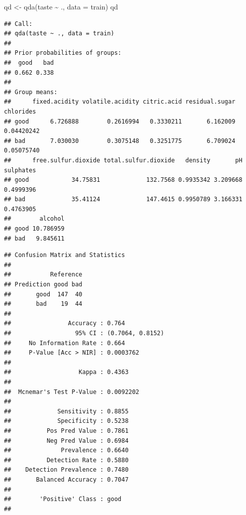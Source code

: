 \documentclass[
  spanish,
]{book}
\newenvironment{Shaded}{\begin{snugshade}}{\end{snugshade}}
\newcommand{\AttributeTok}[1]{\textcolor[rgb]{0.77,0.63,0.00}{#1}}
\newcommand{\FunctionTok}[1]{\textcolor[rgb]{0.00,0.00,0.00}{#1}}
\newcommand{\NormalTok}[1]{#1}
\newcommand{\OtherTok}[1]{\textcolor[rgb]{0.56,0.35,0.01}{#1}}
\newcommand{\SpecialCharTok}[1]{\textcolor[rgb]{0.00,0.00,0.00}{#1}}
\theoremstyle{break}
\theoremstyle{definition}
\theoremstyle{definition}
\theoremstyle{definition}
\theoremstyle{definition}
\theoremstyle{remark}
\begin{document}
\begin{Shaded}
\begin{Highlighting}[]
\NormalTok{qd }\OtherTok{\textless{}{-}} \FunctionTok{qda}\NormalTok{(taste }\SpecialCharTok{\textasciitilde{}}\NormalTok{ ., }\AttributeTok{data =}\NormalTok{ train)}
\NormalTok{qd}
\end{Highlighting}
\end{Shaded}

\begin{verbatim}
## Call:
## qda(taste ~ ., data = train)
## 
## Prior probabilities of groups:
##  good   bad 
## 0.662 0.338 
## 
## Group means:
##      fixed.acidity volatile.acidity citric.acid residual.sugar  chlorides
## good      6.726888        0.2616994   0.3330211       6.162009 0.04420242
## bad       7.030030        0.3075148   0.3251775       6.709024 0.05075740
##      free.sulfur.dioxide total.sulfur.dioxide   density       pH sulphates
## good            34.75831             132.7568 0.9935342 3.209668 0.4999396
## bad             35.41124             147.4615 0.9950789 3.166331 0.4763905
##        alcohol
## good 10.786959
## bad   9.845611
\end{verbatim}

\begin{Shaded}
\end{Shaded}

\begin{verbatim}
## Confusion Matrix and Statistics
## 
##           Reference
## Prediction good bad
##       good  147  40
##       bad    19  44
##                                           
##                Accuracy : 0.764           
##                  95% CI : (0.7064, 0.8152)
##     No Information Rate : 0.664           
##     P-Value [Acc > NIR] : 0.0003762       
##                                           
##                   Kappa : 0.4363          
##                                           
##  Mcnemar's Test P-Value : 0.0092202       
##                                           
##             Sensitivity : 0.8855          
##             Specificity : 0.5238          
##          Pos Pred Value : 0.7861          
##          Neg Pred Value : 0.6984          
##              Prevalence : 0.6640          
##          Detection Rate : 0.5880          
##    Detection Prevalence : 0.7480          
##       Balanced Accuracy : 0.7047          
##                                           
##        'Positive' Class : good            
## 
\end{verbatim}
\end{document}
